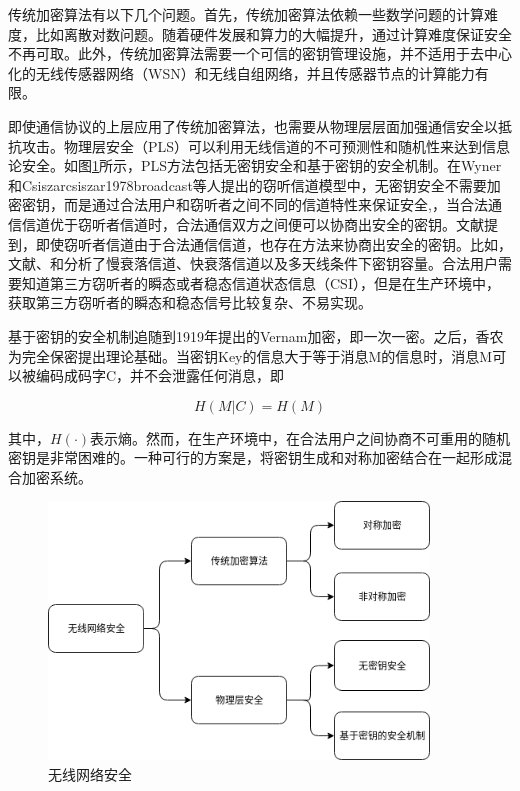 \documentclass[master]{seuthesis} %
\begin{document}
\begin{Main}
传统加密算法有以下几个问题。首先，传统加密算法依赖一些数学问题的计算难度，比如离散对数问题\cite{forouzan2007cryptography}。随着硬件发展和算力的大幅提升，通过计算难度保证安全不再可取。此外，传统加密算法需要一个可信的密钥管理设施，并不适用于去中心化的无线传感器网络（WSN）和无线自组网络，并且传感器节点的计算能力有限。

即使通信协议的上层应用了传统加密算法，也需要从物理层层面加强通信安全以抵抗攻击。物理层安全（PLS）可以利用无线信道的不可预测性和随机性来达到信息论安全。如图\ref{wirelss-network-security}所示，PLS方法包括无密钥安全和基于密钥的安全机制。在Wyner\cite{wyner1975wire}和Csiszar{csiszar1978broadcast}等人提出的窃听信道模型中，无密钥安全不需要加密密钥，而是通过合法用户和窃听者之间不同的信道特性来保证安全\cite{6739367},，当合法通信信道优于窃听者信道时，合法通信双方之间便可以协商出安全的密钥。文献\citet{peng2017secret}提到，即使窃听者信道由于合法通信信道，也存在方法来协商出安全的密钥。比如，文献\citet{parada2005secrecy}、\citet{liu2009note}和\citet{li2007secret2}分析了慢衰落信道\cite{gopala2008secrecy}、快衰落信道\cite{li2007secret}以及多天线条件下密钥容量。合法用户需要知道第三方窃听者的瞬态或者稳态信道状态信息（CSI），但是在生产环境中，获取第三方窃听者的瞬态和稳态信号比较复杂、不易实现。

基于密钥的安全机制追随到1919年提出的Vernam加密，即一次一密\cite{vernam1922secret}。之后，香农为完全保密提出理论基础\cite{shannon1949communication}。当密钥Key的信息大于等于消息M的信息时，消息M可以被编码成码字C，并不会泄露任何消息，即

\begin{equation}
    H(M|C) = H(M)
\end{equation}

其中，$H(\cdot)$表示熵。然而，在生产环境中，在合法用户之间协商不可重用的随机密钥是非常困难的。一种可行的方案是，将密钥生成和对称加密结合在一起形成混合加密系统。

\begin{figure}[htbp!]
    \centering \includegraphics[width=0.9\textwidth]{images/wireless-network-security} 
    \caption{无线网络安全}
    \label{wirelss-network-security}
\end{figure}


\end{Main}
\end{document}
